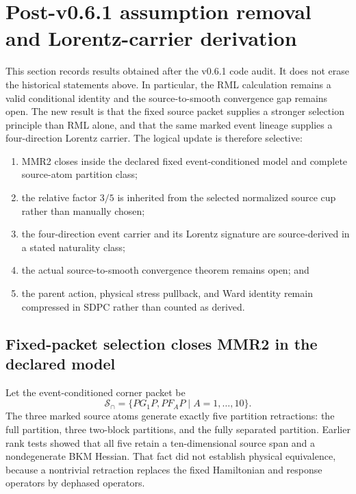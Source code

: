 \documentclass[11pt]{article}
\theoremstyle{definition}
\theoremstyle{remark}
\newcommand{\cS}{\mathcal{S}}
\begin{document}
\section{Post-v0.6.1 assumption removal and Lorentz-carrier derivation}\label{sec:v07update}

This section records results obtained after the v0.6.1 code audit. It does not erase the historical statements above. In particular, the RML calculation remains a valid conditional identity and the source-to-smooth convergence gap remains open. The new result is that the fixed source packet supplies a stronger selection principle than RML alone, and that the same marked event lineage supplies a four-direction Lorentz carrier. The logical update is therefore selective:
\begin{enumerate}
\item MMR2 closes inside the declared fixed event-conditioned model and complete source-atom partition class;
\item the relative factor $3/5$ is inherited from the selected normalized source cup rather than manually chosen;
\item the four-direction event carrier and its Lorentz signature are source-derived in a stated naturality class;
\item the actual source-to-smooth convergence theorem remains open; and
\item the parent action, physical stress pullback, and Ward identity remain compressed in SDPC rather than counted as derived.
\end{enumerate}

\subsection{Fixed-packet selection closes MMR2 in the declared model}

Let the event-conditioned corner packet be
\begin{equation}\label{eq:v07packet}
 \cS_{\cap}=\{PG_1P,PF_AP\;|\;A=1,\ldots,10\}.
\end{equation}
The three marked source atoms generate exactly five partition retractions: the full partition, three two-block partitions, and the fully separated partition. Earlier rank tests showed that all five retain a ten-dimensional source span and a nondegenerate BKM Hessian. That fact did not establish physical equivalence, because a nontrivial retraction replaces the fixed Hamiltonian and response operators by dephased operators.
\end{document}
